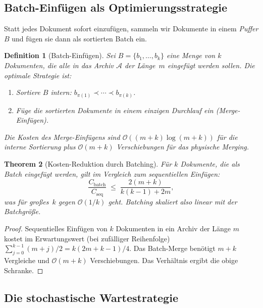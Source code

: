 ﻿\documentclass[12pt, a4paper]{article}
\newtheorem{theorem}{Theorem}[section]
\newtheorem{definition}[theorem]{Definition}
\begin{document}
\subsection{Batch-Einfügen als Optimierungsstrategie}

Statt jedes Dokument sofort einzufügen, sammeln wir Dokumente in einem
\emph{Puffer} $B$ und fügen sie dann als sortierten Batch ein.

\begin{definition}[Batch-Einfügen]\label{def:batch}
Sei $B = \{b_1, \ldots, b_k\}$ eine Menge von $k$ Dokumenten, die alle in das
Archiv $\mathcal{A}$ der Länge~$m$ eingefügt werden sollen. Die optimale
Strategie ist:
\begin{enumerate}[label=\arabic*.,noitemsep]
  \item Sortiere $B$ intern: $b_{\pi(1)} \prec \cdots \prec b_{\pi(k)}$.
  \item Füge die sortierten Dokumente in einem einzigen Durchlauf ein
        (\emph{Merge-Einfügen}).
\end{enumerate}
Die Kosten des Merge-Einfügens sind $\mathcal{O}((m+k)\log(m+k))$ für die
interne Sortierung plus $\mathcal{O}(m+k)$ Verschiebungen für das physische
Merging.
\end{definition}

\begin{theorem}[Kosten-Reduktion durch Batching]\label{thm:batchreduction}
Für $k$ Dokumente, die als Batch eingefügt werden, gilt im Vergleich zum
sequentiellen Einfügen:
\[
  \frac{C_{\mathrm{batch}}}{C_{\mathrm{seq}}} \;\leq\; \frac{2(m+k)}{k(k-1)+2m},
\]
was für großes~$k$ gegen $\mathcal{O}(1/k)$ geht. Batching skaliert also
linear mit der Batchgröße.
\end{theorem}

\begin{proof}
Sequentielles Einfügen von $k$ Dokumenten in ein Archiv der Länge $m$
kostet im Erwartungswert (bei zufälliger Reihenfolge)
$\sum_{j=0}^{k-1}(m+j)/2 = k(2m+k-1)/4$. Das Batch-Merge benötigt $m+k$
Vergleiche und $\mathcal{O}(m+k)$ Verschiebungen. Das Verhältnis ergibt die
obige Schranke.
\end{proof}

\subsection{Die stochastische Wartestrategie}\label{sec:waitstrat}
\end{document}

